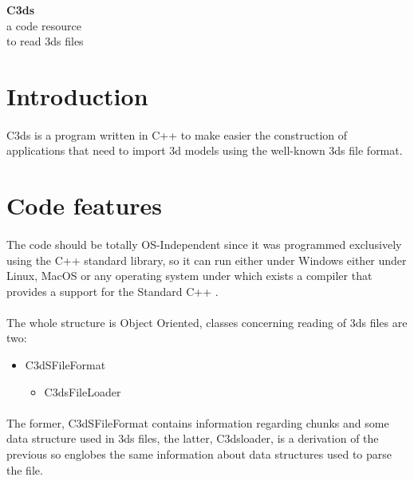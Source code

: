 \documentclass[11pt,a4paper]{article}
\author{Andrea Ingegneri}
\begin{document}
\begin{center}
\fontsize{25}{25}
\selectfont
\textbf{C3ds\\}
\fontsize{18}{18}
\selectfont
a code resource\\ to read 3ds files
\end{center}
\section*{Introduction}

\paragraph*{}
C3ds is a program written in C++ to make easier the construction of applications that need to import 3d models using the well-known 3ds file format.\\

\section*{Code features}
\paragraph*{}
The code should be totally OS-Independent since it was programmed exclusively using the C++ standard library, so it can run either under Windows either under Linux, MacOS or any operating system under which exists a compiler that provides a support for the Standard C++ .

\paragraph*{}
The whole structure is Object Oriented, classes concerning reading of 3ds files are two:

\begin{itemize}
\item C3dSFileFormat
\begin{itemize}
\item C3dsFileLoader
\end{itemize} 
\end{itemize}

\paragraph*{}
The former, C3dSFileFormat contains information regarding chunks and some data structure used in 3ds files, the latter, C3dsloader, is a derivation of the previous so englobes the same information about data structures used to parse the file.
\end{document}
